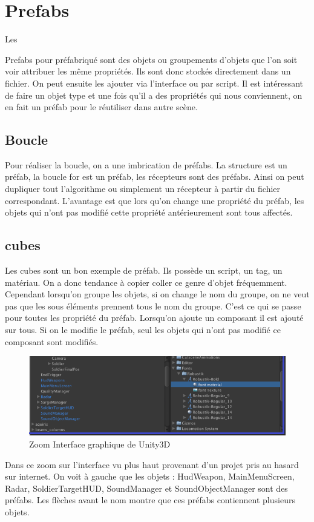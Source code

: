\documentclass[a4paper,11pt]{myreport}
\begin{document}
	\section{Prefabs}
	\par \hypertarget{prefabTarget}{Les} Prefabs pour préfabriqué sont des objets ou groupements d'objets que l'on soit voir attribuer les même propriétés. Ils sont donc stockés directement dans un fichier. On peut ensuite les ajouter via l'interface ou par script. Il est intéressant de faire un objet type et une fois qu'il a des propriétés qui nous conviennent, on en fait un préfab pour le réutiliser dans autre scène.
	
	\subsection{Boucle}
	\par Pour réaliser la boucle, on a une imbrication de préfabs. La structure est un préfab, la boucle for est un préfab, les récepteurs sont des préfabs. Ainsi on peut dupliquer tout l'algorithme ou simplement un récepteur à partir du fichier correspondant. L'avantage est que lors qu'on change une propriété du préfab, les objets qui n'ont pas modifié cette propriété antérieurement sont tous affectés.
	\subsection{cubes}
	\par Les cubes sont un bon exemple de préfab. Ils possède un script, un tag, un matériau. On a donc tendance à copier coller ce genre d'objet fréquemment. Cependant lorsqu'on groupe les objets, si on change le nom du groupe, on ne veut pas que les sous éléments prennent tous le nom du groupe. C'est ce qui se passe pour toutes les propriété du préfab. Lorsqu'on ajoute un composant il est ajouté sur tous. Si on le modifie le préfab, seul les objets qui n'ont pas modifié ce composant sont modifiés.
	\begin{figure}[h]
	\includegraphics[scale=0.90]{./images/unity-3D_interface_zoom.png}
	\caption{Zoom Interface graphique de Unity3D}
	\end{figure}
	\par Dans ce zoom sur l'interface vu plus haut provenant d'un projet pris au hasard sur internet. On voit à gauche que les objets : HudWeapon, MainMenuScreen, Radar, SoldierTargetHUD, SoundManager et SoundObjectManager sont des préfabs. Les flèches avant le nom montre que ces préfabs contiennent plusieurs objets.
	
\end{document}
